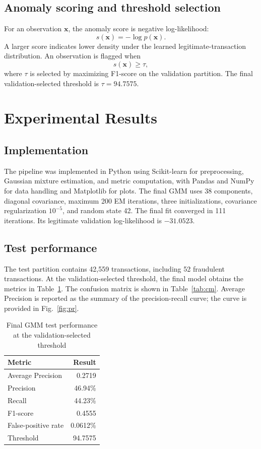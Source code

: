 \documentclass[conference]{IEEEtran}
\begin{document}
\subsection{Anomaly scoring and threshold selection}
For an observation $\mathbf{x}$, the anomaly score is negative log-likelihood:
\begin{equation}
s(\mathbf{x})=-\log p(\mathbf{x}).
\label{eq:score}
\end{equation}
A larger score indicates lower density under the learned legitimate-transaction distribution. An observation is flagged when
\begin{equation}
s(\mathbf{x})\geq\tau,
\end{equation}
where $\tau$ is selected by maximizing F1-score on the validation partition. The final validation-selected threshold is $\tau=94.7575$.

\section{Experimental Results}
\subsection{Implementation}
The pipeline was implemented in Python using Scikit-learn for preprocessing, Gaussian mixture estimation, and metric computation, with Pandas and NumPy for data handling and Matplotlib for plots. The final GMM uses 38 components, diagonal covariance, maximum 200 EM iterations, three initializations, covariance regularization $10^{-5}$, and random state 42. The final fit converged in 111 iterations. Its legitimate validation log-likelihood is $-31.0523$.

\subsection{Test performance}
The test partition contains 42,559 transactions, including 52 fraudulent transactions. At the validation-selected threshold, the final model obtains the metrics in Table~\ref{tab:metrics}. The confusion matrix is shown in Table~\ref{tab:cm}. Average Precision is reported as the summary of the precision-recall curve; the curve is provided in Fig.~\ref{fig:pr}.

\begin{table}[t]
\caption{Final GMM test performance at the validation-selected threshold}
\label{tab:metrics}
\centering
\small
\begin{tabular}{lr}
\toprule
Metric & Result\\
\midrule
Average Precision & 0.2719\\
Precision & 46.94\%\\
Recall & 44.23\%\\
F1-score & 0.4555\\
False-positive rate & 0.0612\%\\
Threshold & 94.7575\\
\bottomrule
\end{tabular}
\end{table}
\end{document}
